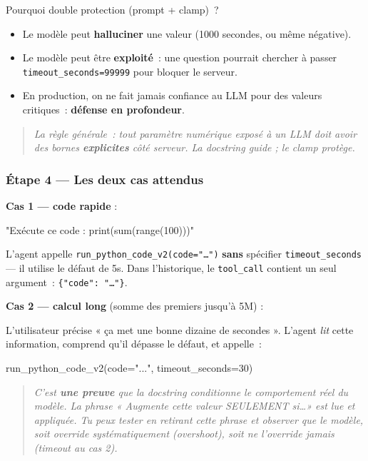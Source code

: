 \documentclass[11pt,a4paper]{article}
\begin{document}
Pourquoi double protection (prompt + clamp)~?
\begin{itemize}[leftmargin=*]
  \item Le modèle peut \textbf{halluciner} une valeur (1000 secondes,
        ou même négative).
  \item Le modèle peut être \textbf{exploité}~: une question pourrait
        chercher à passer \texttt{timeout\_seconds=99999} pour bloquer
        le serveur.
  \item En production, on ne fait jamais confiance au LLM pour des
        valeurs critiques~: \textbf{défense en profondeur}.
\end{itemize}

\begin{quote}\itshape
La règle générale~: tout paramètre numérique exposé à un LLM doit avoir
des bornes \textbf{explicites} côté serveur. La docstring guide ; le
clamp protège.
\end{quote}

\subsubsection*{Étape 4 — Les deux cas attendus}

\textbf{Cas 1 — code rapide} :

\begin{pythoncode}
"Exécute ce code : print(sum(range(100)))"
\end{pythoncode}

L'agent appelle \texttt{run\_python\_code\_v2(code="\dots")} \textbf{sans}
spécifier \texttt{timeout\_seconds} — il utilise le défaut de 5s.
Dans l'historique, le \texttt{tool\_call} contient un seul argument~:
\texttt{\{"code": "\dots"\}}.

\textbf{Cas 2 — calcul long} (somme des premiers jusqu'à 5M) :

L'utilisateur précise « ça met une bonne dizaine de secondes ». L'agent
\emph{lit} cette information, comprend qu'il dépasse le défaut, et
appelle~:

\begin{pythoncode}
run_python_code_v2(code="...", timeout_seconds=30)
\end{pythoncode}

\begin{quote}\itshape
C'est \textbf{une preuve} que la docstring conditionne le comportement
réel du modèle. La phrase « Augmente cette valeur SEULEMENT si\dots » est
lue et appliquée. Tu peux tester en retirant cette phrase et observer
que le modèle, soit override systématiquement (overshoot), soit ne
l'override jamais (timeout au cas 2).
\end{quote}
\end{document}
